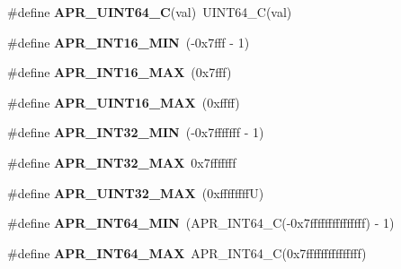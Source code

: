 \begin{DoxyCompactItemize}
\item 
\hypertarget{group__apr__platform_gaede133b7384b6a7a08c51cf1fa9c4001}{\#define {\bfseries A\-P\-R\-\_\-\-U\-I\-N\-T64\-\_\-\-C}(val)~U\-I\-N\-T64\-\_\-\-C(val)}\label{group__apr__platform_gaede133b7384b6a7a08c51cf1fa9c4001}

\item 
\hypertarget{group__apr__platform_ga93b69f6b2d426b30c991a74f55be5308}{\#define {\bfseries A\-P\-R\-\_\-\-I\-N\-T16\-\_\-\-M\-I\-N}~(-\/0x7fff -\/ 1)}\label{group__apr__platform_ga93b69f6b2d426b30c991a74f55be5308}

\item 
\hypertarget{group__apr__platform_gac4180108ae7cfe8b7f636183368c89c5}{\#define {\bfseries A\-P\-R\-\_\-\-I\-N\-T16\-\_\-\-M\-A\-X}~(0x7fff)}\label{group__apr__platform_gac4180108ae7cfe8b7f636183368c89c5}

\item 
\hypertarget{group__apr__platform_ga2b7a0eb7506ac0bfc4d711929f9a3a48}{\#define {\bfseries A\-P\-R\-\_\-\-U\-I\-N\-T16\-\_\-\-M\-A\-X}~(0xffff)}\label{group__apr__platform_ga2b7a0eb7506ac0bfc4d711929f9a3a48}

\item 
\hypertarget{group__apr__platform_gaa99bd633c3478131fa672559601a76e7}{\#define {\bfseries A\-P\-R\-\_\-\-I\-N\-T32\-\_\-\-M\-I\-N}~(-\/0x7fffffff -\/ 1)}\label{group__apr__platform_gaa99bd633c3478131fa672559601a76e7}

\item 
\hypertarget{group__apr__platform_ga0966ef0d235765d9fe1b9900fbe04faa}{\#define {\bfseries A\-P\-R\-\_\-\-I\-N\-T32\-\_\-\-M\-A\-X}~0x7fffffff}\label{group__apr__platform_ga0966ef0d235765d9fe1b9900fbe04faa}

\item 
\hypertarget{group__apr__platform_ga239c26656c361f627f7db619997abaac}{\#define {\bfseries A\-P\-R\-\_\-\-U\-I\-N\-T32\-\_\-\-M\-A\-X}~(0xffffffff\-U)}\label{group__apr__platform_ga239c26656c361f627f7db619997abaac}

\item 
\hypertarget{group__apr__platform_gaf371ae92dbf0fed20801cf279cd85f1a}{\#define {\bfseries A\-P\-R\-\_\-\-I\-N\-T64\-\_\-\-M\-I\-N}~(A\-P\-R\-\_\-\-I\-N\-T64\-\_\-\-C(-\/0x7fffffffffffffff) -\/ 1)}\label{group__apr__platform_gaf371ae92dbf0fed20801cf279cd85f1a}

\item 
\hypertarget{group__apr__platform_ga3b25669924dcfa853cd6ea3395c8717f}{\#define {\bfseries A\-P\-R\-\_\-\-I\-N\-T64\-\_\-\-M\-A\-X}~A\-P\-R\-\_\-\-I\-N\-T64\-\_\-\-C(0x7fffffffffffffff)}\label{group__apr__platform_ga3b25669924dcfa853cd6ea3395c8717f}


\end{DoxyCompactItemize}
